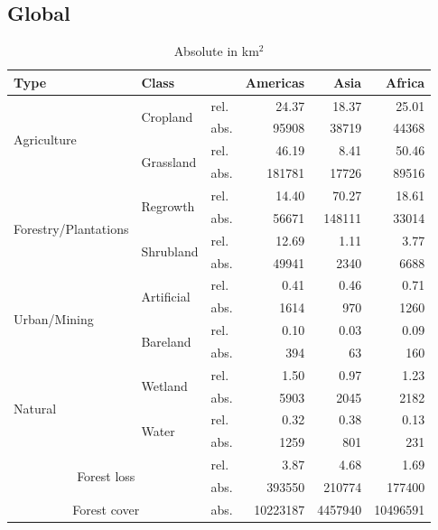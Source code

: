 		\subsection{Global}
			\begin{table}[ht]
				\centering
				\caption[Deforestation driver]{Absolute in km$^2$}
				\label{tab:driver_tab}
				\begin{tabular}{lllrrr} 	Type & Class & & Americas & Asia & Africa \\\hline
					\multirow{4}{*}{Agriculture} & \multirow{2}{*}{Cropland} & rel. & 24.37 & 18.37 & 25.01 \\
					& & abs. & 95908 & 38719 & 44368 \\
					& \multirow{2}{*}{Grassland} & rel. & 46.19 & 8.41 & 50.46 \\
					& & abs. & 181781 & 17726 & 89516 \\
					\multirow{4}{*}{Forestry/Plantations} & \multirow{2}{*}{Regrowth} & rel. & 14.40 & 70.27 & 18.61 \\
					& & abs. & 56671 & 148111 & 33014 \\
					& \multirow{2}{*}{Shrubland} & rel. & 12.69 & 1.11 & 3.77 \\
					& & abs. & 49941 & 2340 & 6688 \\
					\multirow{4}{*}{Urban/Mining} & \multirow{2}{*}{Artificial} & rel. & 0.41 & 0.46 & 0.71 \\
					& & abs. & 1614 & 970 & 1260 \\
					& \multirow{2}{*}{Bareland} & rel. & 0.10 & 0.03 & 0.09 \\
					& & abs. & 394 & 63 & 160 \\
					\multirow{4}{*}{Natural} & \multirow{2}{*}{Wetland} & rel. & 1.50 & 0.97 & 1.23 \\
					& & abs. & 5903 & 2045 & 2182 \\
					& \multirow{2}{*}{Water} & rel. & 0.32 & 0.38 & 0.13 \\
					& & abs. & 1259 & 801 & 231 \\\hline
					\multicolumn{2}{c}{\multirow{2}{*}{Forest loss}} & rel. & 3.87 & 4.68 & 1.69 \\
					& & abs. & 393550 & 210774 & 177400 \\
					\multicolumn{2}{c}{Forest cover} & abs. & 10223187 & 4457940 & 10496591 \\\hline
				\end{tabular}
			\end{table}


